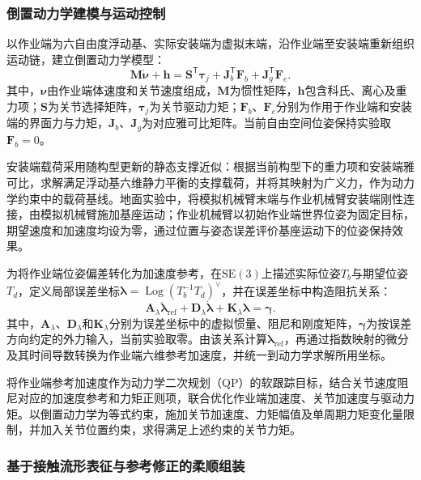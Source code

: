 \documentclass[UTF8,a4paper,zihao=-4,fontset=fandol]{ctexart}
\begin{document}
\subsubsection{倒置动力学建模与运动控制}

以作业端为六自由度浮动基、实际安装端为虚拟末端，沿作业端至安装端重新组织运动链，建立倒置动力学模型：
\begin{equation}
  \bm M\dot{\bm\nu}+\bm h
  =\bm S^{\mathsf T}\bm\tau_j
  +\bm J_b^{\mathsf T}\bm F_b
  +\bm J_g^{\mathsf T}\bm F_e .
  \label{eq:reverse_dynamics}
\end{equation}
其中，$\bm\nu$由作业端体速度和关节速度组成，$\bm M$为惯性矩阵，$\bm h$包含科氏、离心及重力项；$\bm S$为关节选择矩阵，$\bm\tau_j$为关节驱动力矩；$\bm F_b$、$\bm F_e$分别为作用于作业端和安装端的界面力与力矩，$\bm J_b$、$\bm J_g$为对应雅可比矩阵。当前自由空间位姿保持实验取$\bm F_b=0$。

安装端载荷采用随构型更新的静态支撑近似：根据当前构型下的重力项和安装端雅可比，求解满足浮动基六维静力平衡的支撑载荷，并将其映射为广义力，作为动力学约束中的载荷基线。地面实验中，将模拟机械臂末端与作业机械臂安装端刚性连接，由模拟机械臂施加基座运动；作业机械臂以初始作业端世界位姿为固定目标，期望速度和加速度均设为零，通过位置与姿态误差评价基座运动下的位姿保持效果。

为将作业端位姿偏差转化为加速度参考，在$\mathrm{SE}(3)$上描述实际位姿$T_b$与期望位姿$T_d$，定义局部误差坐标$\bm\lambda=\operatorname{Log}(T_b^{-1}T_d)^\vee$，并在误差坐标中构造阻抗关系\cite{kim2025}：
\begin{equation}
  \bm A_\lambda\ddot{\bm\lambda}_{\mathrm{ref}}
  +\bm D_\lambda\dot{\bm\lambda}
  +\bm K_\lambda\bm\lambda
  =\bm\gamma .
  \label{eq:impedance}
\end{equation}
其中，$\bm A_\lambda$、$\bm D_\lambda$和$\bm K_\lambda$分别为误差坐标中的虚拟惯量、阻尼和刚度矩阵，$\bm\gamma$为按误差方向约定的外力输入，当前实验取零。由该关系计算$\ddot{\bm\lambda}_{\mathrm{ref}}$，再通过指数映射的微分及其时间导数转换为作业端六维参考加速度，并统一到动力学求解所用坐标。

将作业端参考加速度作为动力学二次规划（QP）的软跟踪目标，结合关节速度阻尼对应的加速度参考和力矩正则项，联合优化作业端加速度、关节加速度与驱动力矩。以倒置动力学为等式约束，施加关节加速度、力矩幅值及单周期力矩变化量限制，并加入关节位置约束，求得满足上述约束的关节力矩。

\subsubsection{基于接触流形表征与参考修正的柔顺组装}
\end{document}
